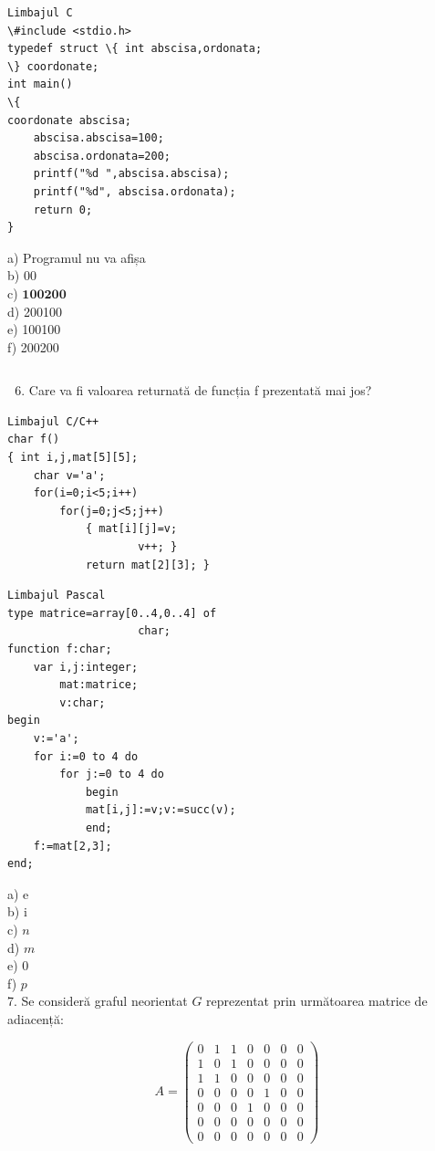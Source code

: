 \documentclass[10pt]{article}
\begin{document}
\begin{verbatim}
Limbajul C
\#include <stdio.h>
typedef struct \{ int abscisa,ordonata;
\} coordonate;
int main()
\{
coordonate abscisa;
    abscisa.abscisa=100;
    abscisa.ordonata=200;
    printf("%d ",abscisa.abscisa);
    printf("%d", abscisa.ordonata);
    return 0;
}
\end{verbatim}

a) Programul nu va afișa\\
b) 00\\
c) $\mathbf{1 0 0} \mathbf{2 0 0}$\\
d) 200100\\
e) 100100\\
f) 200200

\begin{verbatim}

\end{verbatim}

\begin{enumerate}
  \setcounter{enumi}{5}
  \item Care va fi valoarea returnată de funcția f prezentată mai jos?
\end{enumerate}

\begin{verbatim}
Limbajul C/C++
char f()
{ int i,j,mat[5][5];
    char v='a';
    for(i=0;i<5;i++)
        for(j=0;j<5;j++)
            { mat[i][j]=v;
                    v++; }
            return mat[2][3]; }
\end{verbatim}

\begin{verbatim}
Limbajul Pascal
type matrice=array[0..4,0..4] of
                    char;
function f:char;
    var i,j:integer;
        mat:matrice;
        v:char;
begin
    v:='a';
    for i:=0 to 4 do
        for j:=0 to 4 do
            begin
            mat[i,j]:=v;v:=succ(v);
            end;
    f:=mat[2,3];
end;
\end{verbatim}

a) e\\
b) i\\
c) $n$\\
d) $m$\\
e) 0\\
f) $p$\\
7. Se consideră graful neorientat $G$ reprezentat prin următoarea matrice de adiacență:

$$
A=\left(\begin{array}{lllllll}
0 & 1 & 1 & 0 & 0 & 0 & 0 \\
1 & 0 & 1 & 0 & 0 & 0 & 0 \\
1 & 1 & 0 & 0 & 0 & 0 & 0 \\
0 & 0 & 0 & 0 & 1 & 0 & 0 \\
0 & 0 & 0 & 1 & 0 & 0 & 0 \\
0 & 0 & 0 & 0 & 0 & 0 & 0 \\
0 & 0 & 0 & 0 & 0 & 0 & 0
\end{array}\right)
$$
\end{document}
